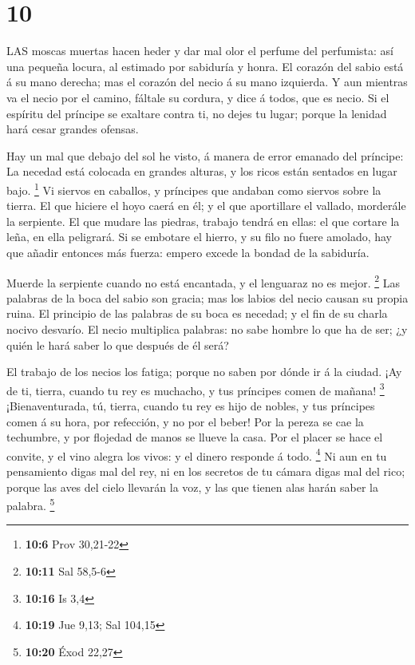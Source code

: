 \hypertarget{section-9}{%
\section{10}\label{section-9}}

 LAS moscas muertas hacen heder y dar mal olor el perfume
del perfumista: así una pequeña locura, al estimado por sabiduría y
honra.  El corazón del sabio está á su mano derecha; mas el
corazón del necio á su mano izquierda.  Y aun mientras va el
necio por el camino, fáltale su cordura, y dice á todos, que es necio.
 Si el espíritu del príncipe se exaltare contra ti, no dejes
tu lugar; porque la lenidad hará cesar grandes ofensas.

 Hay un mal que debajo del sol he visto, á manera de error
emanado del príncipe:  La necedad está colocada en grandes
alturas, y los ricos están sentados en lugar bajo. \footnote{\textbf{10:6}
  Prov 30,21-22}  Vi siervos en caballos, y príncipes que
andaban como siervos sobre la tierra.  El que hiciere el
hoyo caerá en él; y el que aportillare el vallado, morderále la
serpiente.  El que mudare las piedras, trabajo tendrá en
ellas: el que cortare la leña, en ella peligrará.  Si se
embotare el hierro, y su filo no fuere amolado, hay que añadir entonces
más fuerza: empero excede la bondad de la sabiduría.

 Muerde la serpiente cuando no está encantada, y el
lenguaraz no es mejor. \footnote{\textbf{10:11} Sal 58,5-6}
 Las palabras de la boca del sabio son gracia; mas los
labios del necio causan su propia ruina.  El principio de
las palabras de su boca es necedad; y el fin de su charla nocivo
desvarío.  El necio multiplica palabras: no sabe hombre lo
que ha de ser; ¿y quién le hará saber lo que después de él será?

 El trabajo de los necios los fatiga; porque no saben por
dónde ir á la ciudad.  ¡Ay de ti, tierra, cuando tu rey es
muchacho, y tus príncipes comen de mañana! \footnote{\textbf{10:16} Is
  3,4}  ¡Bienaventurada, tú, tierra, cuando tu rey es hijo
de nobles, y tus príncipes comen á su hora, por refección, y no por el
beber!  Por la pereza se cae la techumbre, y por flojedad
de manos se llueve la casa.  Por el placer se hace el
convite, y el vino alegra los vivos: y el dinero responde á todo.
\footnote{\textbf{10:19} Jue 9,13; Sal 104,15}  Ni aun en
tu pensamiento digas mal del rey, ni en los secretos de tu cámara digas
mal del rico; porque las aves del cielo llevarán la voz, y las que
tienen alas harán saber la palabra. \footnote{\textbf{10:20} Éxod 22,27}

